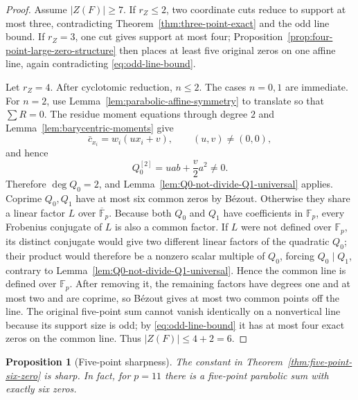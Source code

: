 \documentclass[11pt]{article}
\newtheorem{proposition}[theorem]{Proposition}
\newcommand{\F}{\mathbb F}
\begin{document}
\begin{proof}
Assume $|Z(F)|\ge7$.  If $r_Z\le2$, two coordinate cuts reduce to support at most three, contradicting Theorem~\ref{thm:three-point-exact} and the odd line bound.  If $r_Z=3$, one cut gives support at most four; Proposition~\ref{prop:four-point-large-zero-structure} then places at least five original zeros on one affine line, again contradicting \eqref{eq:odd-line-bound}.

Let $r_Z=4$.  After cyclotomic reduction, $n\le2$.  The cases $n=0,1$ are immediate.  For $n=2$, use Lemma~\ref{lem:parabolic-affine-symmetry} to translate so that $\sum R=0$.  The residue moment equations through degree $2$ and Lemma~\ref{lem:barycentric-moments} give
\[
 \bar c_{x_i}=w_i(ux_i+v),\qquad (u,v)\ne(0,0),
\]
and hence
\[
 Q_0^{[2]}=uab+\frac v2a^2\ne0.
\]
Therefore $\deg Q_0=2$, and Lemma~\ref{lem:Q0-not-divide-Q1-universal} applies.  Coprime $Q_0,Q_1$ have at most six common zeros by B\'ezout.  Otherwise they share a linear factor \(L\) over
\(\overline{\F}_p\).  Because both \(Q_0\) and \(Q_1\) have coefficients
in \(\F_p\), every Frobenius conjugate of \(L\) is also a common factor.
If \(L\) were not defined over \(\F_p\), its distinct conjugate would give
two different linear factors of the quadratic \(Q_0\); their product would
therefore be a nonzero scalar multiple of \(Q_0\), forcing \(Q_0\mid Q_1\),
contrary to Lemma~\ref{lem:Q0-not-divide-Q1-universal}.  Hence the common
line is defined over \(\F_p\).  After removing it, the remaining factors
have degrees one and at most two and are coprime, so B\'ezout gives at most
two common points off the line.  The original five-point sum cannot vanish
identically on a nonvertical line because its support size is odd; by
\eqref{eq:odd-line-bound} it has at most four exact zeros on the common
line.  Thus \(|Z(F)|\le4+2=6\).
\end{proof}


\begin{proposition}[Five-point sharpness]
\label{prop:five-point-sharpness}
The constant in Theorem~\ref{thm:five-point-six-zero} is sharp.  In fact,
for $p=11$ there is a five-point parabolic sum with exactly six zeros.
\end{proposition}
\end{document}
